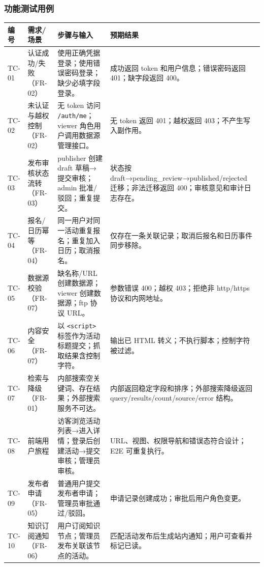 \documentclass[12pt,a4paper]{ctexart}
\begin{document}
\subsubsection{功能测试用例}
\begin{longtable}{p{1.0cm}p{2.8cm}p{4.5cm}p{4.5cm}}
\toprule 编号 & 需求/场景 & 步骤与输入 & 预期结果 \\\midrule\endhead
TC-01 & 认证成功/失败（FR-02） & 使用正确凭据登录；使用错误密码登录；缺少必填字段登录。 & 成功返回 token 和用户信息；错误密码返回 401；缺字段返回 400。 \\
TC-02 & 未认证与越权控制（FR-02） & 无 token 访问 \texttt{/auth/me}；viewer 角色用户调用数据源管理接口。 & 无 token 返回 401；越权返回 403；不产生写入副作用。 \\
TC-03 & 发布审核状态流转（FR-03） & publisher 创建 draft 草稿→提交审核；admin 批准/驳回；重复提交。 & 状态按 draft→pending\_review→published/rejected 迁移；非法迁移返回 400；审核意见和审计日志存在。 \\
TC-04 & 报名/日历幂等（FR-04） & 同一用户对同一活动重复报名；重复加入日历；取消报名。 & 仅存在一条关联记录；取消后报名和日历事件同步移除。 \\
TC-05 & 数据源校验（FR-07） & 缺名称/URL 创建数据源；viewer 创建数据源；ftp 协议 URL。 & 参数错误 400；越权 403；拒绝非 http/https 协议和内网地址。 \\
TC-06 & 内容安全（FR-07） & 以 \texttt{<script>} 标签作为活动标题提交；抓取结果含控制字符。 & 输出已 HTML 转义；不执行脚本；控制字符被过滤。 \\
TC-07 & 检索与降级（FR-01） & 内部搜索空关键词、存在结果；外部搜索服务不可达。 & 内部返回稳定字段和排序；外部搜索降级返回 query/results/count/source/error 结构。 \\
TC-08 & 前端用户旅程 & 访客浏览活动列表→进入详情；登录后创建活动→提交审核；管理员审核。 & URL、视图、权限导航和错误态符合设计；E2E 可重复执行。 \\
TC-09 & 发布者申请（FR-05） & 普通用户提交发布者申请；管理员审批通过/驳回。 & 申请记录创建成功；审批后用户角色变更。 \\
TC-10 & 知识订阅通知（FR-06） & 用户订阅知识节点；管理员发布关联该节点的活动。 & 匹配活动发布后生成站内通知；用户可查看并标记已读。 \\
\bottomrule
\end{longtable}
\end{document}
